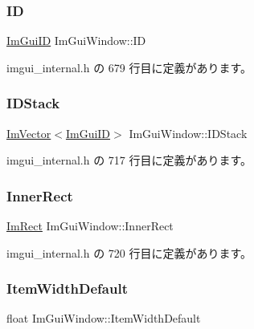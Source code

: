 \subsubsection{\texorpdfstring{ID}{ID}}
{\footnotesize\ttfamily \mbox{\hyperlink{imgui_8h_a1785c9b6f4e16406764a85f32582236f}{Im\+Gui\+ID}} Im\+Gui\+Window\+::\+ID}



 imgui\+\_\+internal.\+h の 679 行目に定義があります。

\mbox{\label{struct_im_gui_window_a1a71724c43e37830ed9b38bd34f26917}} 
\subsubsection{\texorpdfstring{I\+D\+Stack}{IDStack}}
{\footnotesize\ttfamily \mbox{\hyperlink{class_im_vector}{Im\+Vector}}$<$\mbox{\hyperlink{imgui_8h_a1785c9b6f4e16406764a85f32582236f}{Im\+Gui\+ID}}$>$ Im\+Gui\+Window\+::\+I\+D\+Stack}



 imgui\+\_\+internal.\+h の 717 行目に定義があります。

\mbox{\label{struct_im_gui_window_a0fd27908ebffb5d9509dc9e7f199d67d}} 
\subsubsection{\texorpdfstring{Inner\+Rect}{InnerRect}}
{\footnotesize\ttfamily \mbox{\hyperlink{struct_im_rect}{Im\+Rect}} Im\+Gui\+Window\+::\+Inner\+Rect}



 imgui\+\_\+internal.\+h の 720 行目に定義があります。

\mbox{\label{struct_im_gui_window_a5e6be361ee0c71a22a1ff68f6dbf09ff}} 
\subsubsection{\texorpdfstring{Item\+Width\+Default}{ItemWidthDefault}}
{\footnotesize\ttfamily float Im\+Gui\+Window\+::\+Item\+Width\+Default}



